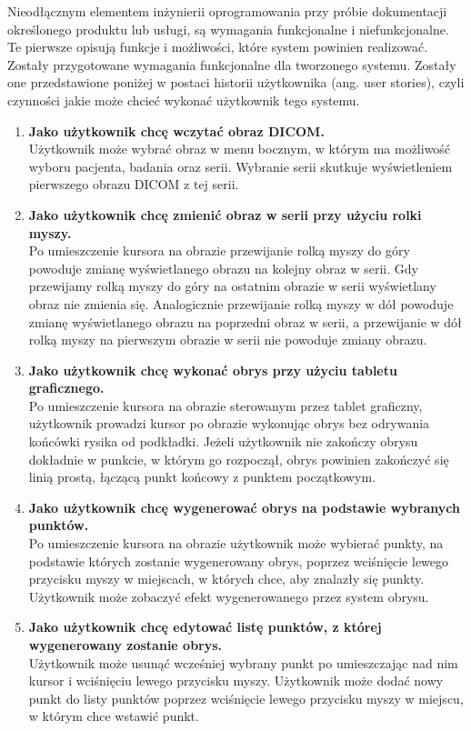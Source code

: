 \documentclass[a4paper,11pt,twoside,openright]{report}
\theoremstyle{definition}
\begin{document}
Nieodłącznym elementem inżynierii oprogramowania przy próbie dokumentacji określonego produktu lub usługi, są wymagania funkcjonalne i niefunkcjonalne. Te pierwsze opisują funkcje i możliwości, które system powinien realizować. Zostały przygotowane wymagania funkcjonalne dla tworzonego systemu. Zostały one przedstawione poniżej w postaci historii użytkownika (ang. user stories), czyli czynności jakie może chcieć wykonać użytkownik tego systemu.
\begin{enumerate}
\item \textbf {Jako użytkownik chcę wczytać obraz DICOM.} \\
Użytkownik może wybrać obraz w menu bocznym, w którym ma możliwość wyboru pacjenta, badania oraz serii. Wybranie serii skutkuje wyświetleniem pierwszego obrazu DICOM z tej serii.

\item \textbf {Jako użytkownik chcę zmienić obraz w serii przy użyciu rolki myszy.} \\
Po umieszczenie kursora na obrazie przewijanie rolką myszy do góry powoduje zmianę wyświetlanego obrazu na kolejny obraz w serii. Gdy przewijamy rolką myszy do góry na ostatnim obrazie w serii wyświetlany obraz nie zmienia się. Analogicznie przewijanie rolką myszy w dół powoduje zmianę wyświetlanego obrazu na poprzedni obraz w serii, a przewijanie w dół rolką myszy na pierwszym obrazie w serii nie powoduje zmiany obrazu.

\item \textbf {Jako użytkownik chcę wykonać obrys przy użyciu tabletu graficznego.} \\
Po umieszczenie kursora na obrazie sterowanym przez tablet graficzny, użytkownik prowadzi kursor po obrazie wykonując obrys bez odrywania końcówki rysika od podkładki. Jeżeli użytkownik nie zakończy obrysu dokładnie w punkcie, w którym go rozpoczął, obrys powinien zakończyć się linią prostą, łączącą punkt końcowy z punktem początkowym.

\item \textbf {Jako użytkownik chcę wygenerować obrys na podstawie wybranych punktów.} \\
Po umieszczenie kursora na obrazie użytkownik może wybierać punkty, na podstawie których zostanie wygenerowany obrys, poprzez wciśnięcie lewego przycisku myszy w miejscach, w których chce, aby znalazły się punkty. Użytkownik może zobaczyć efekt wygenerowanego przez system obrysu.

\item \textbf {Jako użytkownik chcę edytować listę punktów, z której wygenerowany zostanie obrys.} \\
Użytkownik może usunąć wcześniej wybrany punkt po umieszczając nad nim kursor i wciśnięciu lewego przycisku myszy. Użytkownik może dodać nowy punkt do listy punktów poprzez wciśnięcie lewego przycisku myszy w miejscu, w którym chce wstawić punkt.


\end{enumerate}
\end{document}
